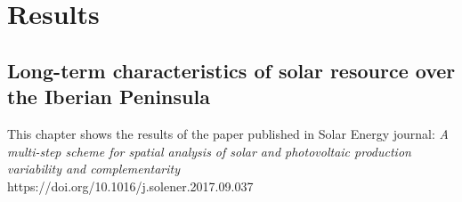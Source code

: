 \part{Results}


\chapter{Long-term characteristics of solar resource over the Iberian Peninsula}

\blfootnote
{This chapter shows the results of the paper published in Solar Energy journal: \textit{A multi-step scheme for spatial analysis of solar and photovoltaic production variability and complementarity}\\
https://doi.org/10.1016/j.solener.2017.09.037}

